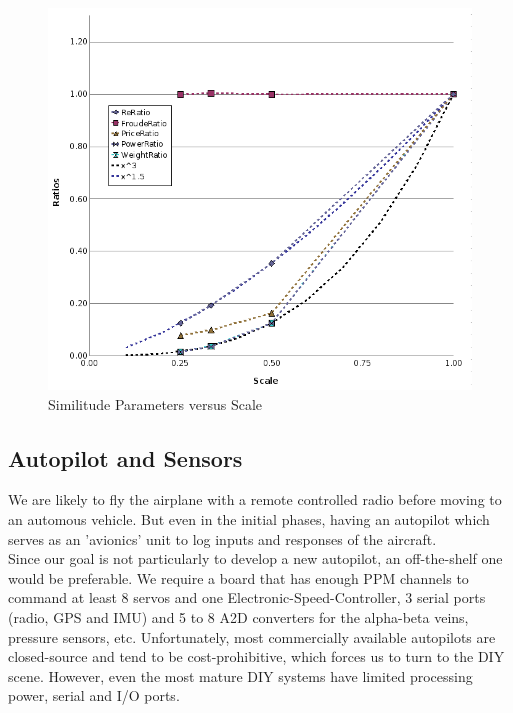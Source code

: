 \documentclass[titlepage,10pt]{article}
\begin{document}
\begin{figure}[h]
\begin{center}
\includegraphics[width=140mm]{scale-graph.PNG}
\end{center}
\caption{Similitude Parameters versus Scale}
\label{fig:scales}
\end{figure}

\clearpage

\subsection{Autopilot and Sensors}
We are likely to fly the airplane with a remote controlled radio before moving to an automous vehicle. But even in the initial phases, having an autopilot which serves as an 'avionics' unit to log inputs and responses of the aircraft.\\

Since our goal is not particularly to develop a new autopilot, an off-the-shelf one would be preferable. We require a board that has enough PPM channels to command at least 8 servos and one Electronic-Speed-Controller, 3 serial ports (radio, GPS and IMU) and 5 to 8 A2D converters for the alpha-beta veins, pressure sensors, etc. Unfortunately, most commercially available autopilots are closed-source and tend to be cost-prohibitive, which forces us to turn to the DIY scene. However, even the most mature DIY systems have limited processing power, serial and I/O ports.\\
\end{document}
